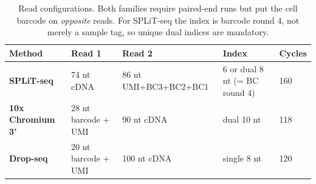 \begin{table}[htbp]\centering
\footnotesize
\caption[]{Read configurations. Both families require paired-end runs but put the cell barcode on \emph{opposite} reads. For SPLiT-seq the index is barcode round 4, not merely a sample tag, so unique dual indices are mandatory.}\label{tab:read-structure}
\begin{tabular}{lllll}
\toprule
Method & Read 1 & Read 2 & Index & Cycles \\
\midrule
\textbf{SPLiT-seq} & 74 nt cDNA & 86 nt UMI+BC3+BC2+BC1 & 6 or dual 8 nt (= BC round 4) & 160 \\
\textbf{10x Chromium 3'} & 28 nt barcode + UMI & 90 nt cDNA & dual 10 nt & 118 \\
\textbf{Drop-seq} & 20 nt barcode + UMI & 100 nt cDNA & single 8 nt & 120 \\
\bottomrule
\end{tabular}
\end{table}
